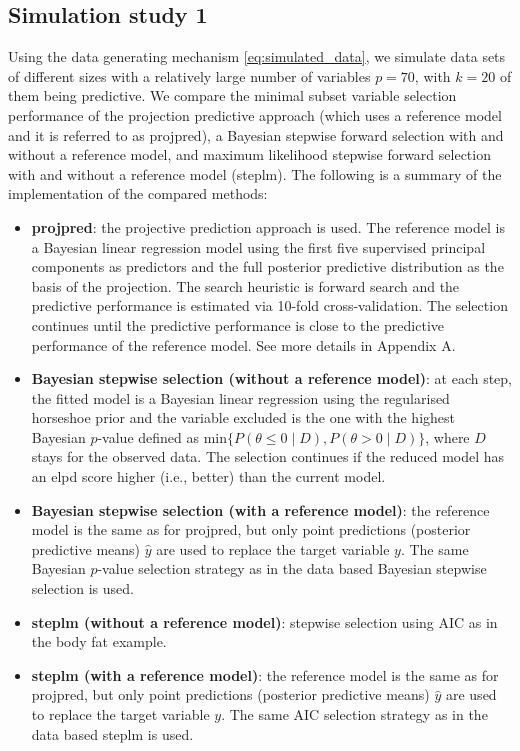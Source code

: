 \documentclass[a4]{article}
\theoremstyle{definition}
\begin{document}
\subsection{Simulation study 1}

Using the data generating mechanism \eqref{eq:simulated_data}, we
simulate data sets of different sizes with a relatively large number
of variables $p=70$, with $k=20$ of them being predictive.  We compare
the minimal subset variable selection performance of the projection
predictive approach (which uses a reference model and it is referred to as projpred), 
a Bayesian stepwise
forward selection with and without a reference model, and maximum
likelihood stepwise forward selection with and without a reference
model (steplm). The following is a summary of the implementation of the compared methods:
\begin{itemize}
\item \textbf{projpred}: the projective prediction approach is used. 
  The reference model is a Bayesian linear regression
  model using the first five supervised principal components \citep{piironen2018} as predictors
  and the full posterior predictive distribution as the basis of the projection.   
  The search heuristic  is forward search and the predictive performance 
  is estimated via 10-fold cross-validation. The selection continues
  until the predictive performance is close to the predictive
  performance of the reference model. See more details in Appendix A.
  
\item \textbf{Bayesian stepwise selection (without a reference model)}: at each step, the fitted model
 is a Bayesian linear regression using the regularised horseshoe
  prior and the variable excluded is the one with the highest Bayesian
  $p$-value defined as $\text{min}\{P(\theta\leq0 \; | \; D),P(\theta>0 \; | \; D)\}$,
  where $D$ stays for the observed data.
The selection continues if the reduced model has an elpd score higher 
(i.e., better) than the current model.

\item \textbf{Bayesian stepwise selection (with a reference model)}: the reference model is the same as for projpred, but only point predictions (posterior predictive means) $\hat{y}$ are used to replace the target variable $y$. The same Bayesian
  $p$-value selection strategy as in the data based Bayesian stepwise selection is used.

\item \textbf{steplm (without a reference model)}: stepwise selection using AIC as in the body fat example.

\item \textbf{steplm (with a reference model)}: the reference model is the same as for
 projpred, but only point predictions (posterior predictive means) $\hat{y}$ 
 are used to replace the target variable $y$. The same AIC selection strategy 
 as in the data based steplm is used.

\end{itemize}
\end{document}
